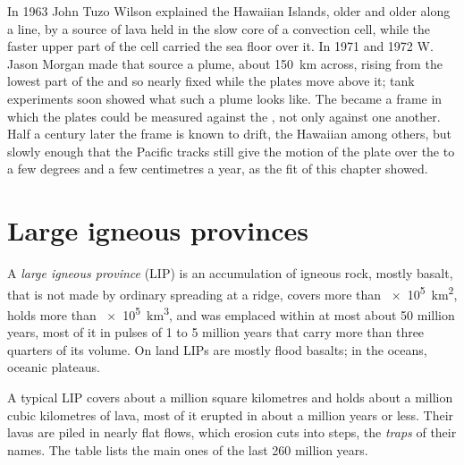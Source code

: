 \begin{history}
In 1963 John Tuzo Wilson explained the Hawaiian Islands, older and older along
a line, by a source of lava held in the slow core of a  convection cell,
while the faster upper part of the cell carried the sea floor over it.
In 1971 and 1972 W. Jason Morgan made that source a plume, about
\qty{150}{km} across, rising from the lowest part of the  and so nearly
fixed while the plates move above it; tank experiments soon showed what such a
plume looks like. The  became a frame in which the plates could be
measured against the , not only against one another. Half a century
later the frame is known to drift, the Hawaiian  among others, but
slowly enough that the Pacific tracks still give the motion of the plate over
the  to a few degrees and a few centimetres a year, as the fit of this
chapter showed.
\end{history}

\section{Large igneous provinces}\label{sec:b1:hotspots:lips}

\begin{definition}\label{def:b1:hotspots:lip}
A \emph{large igneous province} (LIP) is an
accumulation of igneous rock, mostly basalt, that is not made by ordinary
spreading at a ridge, covers more than \qty{e5}{km^2}, holds more than
\qty{e5}{km^3}, and was emplaced within at most about 50 million years, most
of it in pulses of 1 to 5 million years that carry more than three quarters of
its volume. On land LIPs are mostly flood basalts; in the oceans, oceanic
plateaus.
\end{definition}

A typical LIP covers about a million square kilometres and holds about a
million cubic kilometres of lava, most of it erupted in about a million years
or less. Their lavas are piled in nearly flat flows, which erosion cuts into
steps, the \emph{traps} of their names. The table lists the main ones of the
last 260 million years.

